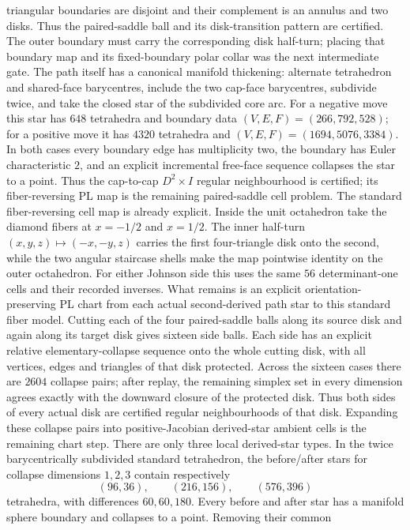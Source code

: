 \documentclass[11pt]{amsart}
\theoremstyle{definition}
\theoremstyle{remark}
\begin{document}
triangular boundaries are disjoint and their complement is an annulus and two
disks.  Thus the paired-saddle ball and its disk-transition pattern are
certified.  The outer boundary must carry the corresponding disk half-turn;
placing that boundary map and its fixed-boundary polar collar was the next intermediate gate.
The path itself has a canonical manifold thickening: alternate tetrahedron and
shared-face barycentres, include the two cap-face barycentres, subdivide twice,
and take the closed star of the subdivided core arc.  For a negative move this
star has $648$ tetrahedra and boundary data $(V,E,F)=(266,792,528)$; for a
positive move it has $4320$ tetrahedra and
$(V,E,F)=(1694,5076,3384)$.  In both cases every boundary edge has multiplicity
two, the boundary has Euler characteristic $2$, and an explicit incremental
free-face sequence collapses the star to a point.  Thus the cap-to-cap
$D^2\times I$ regular neighbourhood is certified; its fiber-reversing PL map
is the remaining paired-saddle cell problem.
The standard fiber-reversing cell map is already explicit.  Inside the unit
octahedron take the diamond fibers at $x=-1/2$ and $x=1/2$.  The inner
half-turn $(x,y,z)\mapsto(-x,-y,z)$ carries the first four-triangle disk onto
the second, while the two angular staircase shells make the map pointwise
identity on the outer octahedron.  For either Johnson side this uses the same
$56$ determinant-one cells and their recorded inverses.  What remains is an
explicit orientation-preserving PL chart from each actual second-derived path
star to this standard fiber model.
Cutting each of the four paired-saddle balls along its source disk and again
along its target disk gives sixteen side balls.  Each side has an explicit
relative elementary-collapse sequence onto the whole cutting disk, with all
vertices, edges and triangles of that disk protected.  Across the sixteen
cases there are $2604$ collapse pairs; after replay, the remaining simplex set
in every dimension agrees exactly with the downward closure of the protected
disk.  Thus both sides of every actual disk are certified regular
neighbourhoods of that disk.  Expanding these collapse pairs into
positive-Jacobian derived-star ambient cells is the remaining chart step.
There are only three local derived-star types.  In the twice barycentrically
subdivided standard tetrahedron, the before/after stars for collapse dimensions
$1,2,3$ contain respectively
\[
(96,36),\qquad(216,156),\qquad(576,396)
\]
tetrahedra, with differences $60,60,180$.  Every before and after star has a
manifold sphere boundary and collapses to a point.  Removing their common
\end{document}
